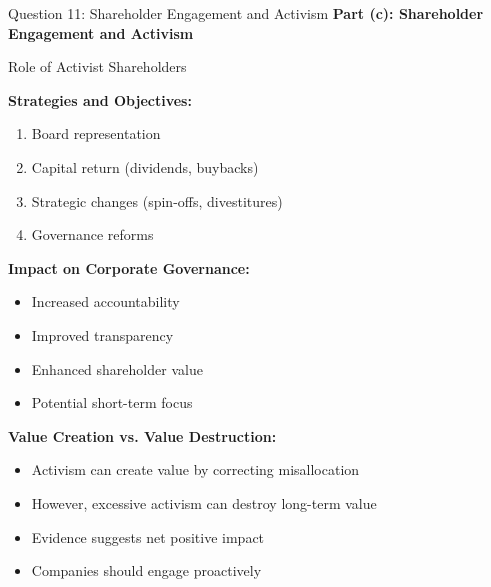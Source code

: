 \documentclass[aspectratio=169]{beamer}
\newcommand{\question}[1]{{\large\bfseries\color{crimson}#1}}
\begin{document}
	\begin{frame}{Question 11: Shareholder Engagement and Activism}
		\question{Part (c): Shareholder Engagement and Activism}
		
		\begin{block}{Role of Activist Shareholders}
			
			\textbf{Strategies and Objectives:}
			\begin{enumerate}
				\item Board representation
				\item Capital return (dividends, buybacks)
				\item Strategic changes (spin-offs, divestitures)
				\item Governance reforms
			\end{enumerate}
			
			\textbf{Impact on Corporate Governance:}
			\begin{itemize}
				\item Increased accountability
				\item Improved transparency
				\item Enhanced shareholder value
				\item Potential short-term focus
			\end{itemize}
			
			\textbf{Value Creation vs. Value Destruction:}
			\begin{itemize}
				\item Activism can create value by correcting misallocation
				\item However, excessive activism can destroy long-term value
				\item Evidence suggests net positive impact
				\item Companies should engage proactively
			\end{itemize}
		\end{block}
	\end{frame}
	
\end{document}
